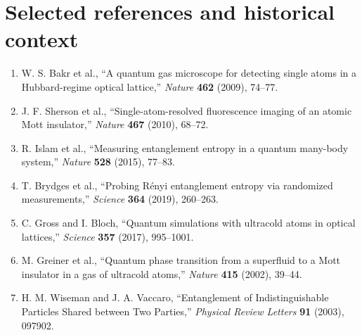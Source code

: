 \documentclass[11pt,a4paper]{article}
\begin{document}
\section{Selected references and historical context}
\begin{enumerate}[leftmargin=*]
\item W. S. Bakr et al., ``A quantum gas microscope for detecting single atoms in a Hubbard-regime optical lattice,'' \emph{Nature} \textbf{462} (2009), 74--77.
\item J. F. Sherson et al., ``Single-atom-resolved fluorescence imaging of an atomic Mott insulator,'' \emph{Nature} \textbf{467} (2010), 68--72.
\item R. Islam et al., ``Measuring entanglement entropy in a quantum many-body system,'' \emph{Nature} \textbf{528} (2015), 77--83.
\item T. Brydges et al., ``Probing R\'enyi entanglement entropy via randomized measurements,'' \emph{Science} \textbf{364} (2019), 260--263.
\item C. Gross and I. Bloch, ``Quantum simulations with ultracold atoms in optical lattices,'' \emph{Science} \textbf{357} (2017), 995--1001.
\item M. Greiner et al., ``Quantum phase transition from a superfluid to a Mott insulator in a gas of ultracold atoms,'' \emph{Nature} \textbf{415} (2002), 39--44.
\item H. M. Wiseman and J. A. Vaccaro, ``Entanglement of Indistinguishable Particles Shared between Two Parties,'' \emph{Physical Review Letters} \textbf{91} (2003), 097902.
\end{enumerate}
\end{document}
